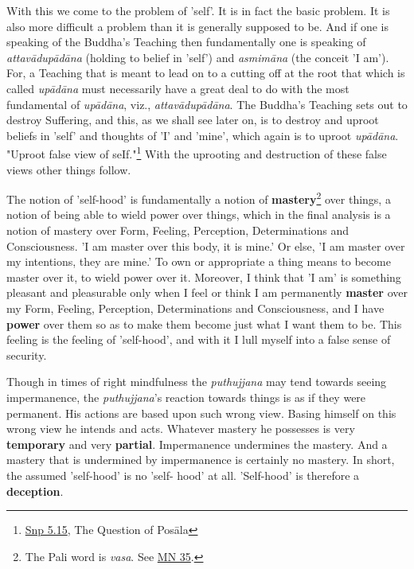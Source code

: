 With this we come to the problem of 'self'. It is in fact the basic problem. It is also more difficult a problem than it is generally supposed to be. And if one is speaking of the Buddha's Teaching then fundamentally one is speaking of \emph{attavādupādāna} (holding to belief in 'self') and \emph{asmimāna} (the conceit 'I am'). For, a Teaching that is meant to lead on to a cutting off at the root that which is called \emph{upādāna} must necessarily have a great deal to do with the most fundamental of \emph{upādāna}, viz., \emph{attavādupādāna}. The Buddha's Teaching sets out to destroy Suffering, and this, as we shall see later on, is to destroy and uproot beliefs in 'self' and thoughts of 'I' and 'mine', which again is to uproot \emph{upādāna}. "Uproot false view of seIf."\footnote{\href{https://suttacentral.net/snp5.15/en/sujato}{Snp 5.15}, The Question of Posāla} With the uprooting and destruction of these false views other things follow.

The notion of 'self-hood' is fundamentally a notion of \textbf{mastery}\footnote{The Pali word is \emph{vasa}. See \href{https://suttacentral.net/mn35/en/sujato}{MN 35}.} over things, a notion of being able to wield power over things, which in the final analysis is a notion of mastery over Form, Feeling, Perception, Determinations and Consciousness. 'I am master over this body, it is mine.' Or else, 'I am master over my intentions, they are mine.' To own or appropriate a thing means to become master over it, to wield power over it. Moreover, I think that 'I am' is something pleasant and pleasurable only when I feel or think I am permanently \textbf{master} over my Form, Feeling, Perception, Determinations and Consciousness, and I have \textbf{power} over them so as to make them become just what I want them to be. This feeling is the feeling of 'self-hood', and with it I lull myself into a false sense of security.

Though in times of right mindfulness the \emph{puthujjana} may tend towards seeing impermanence, the \emph{puthujjana}'s reaction towards things is as if they were permanent. His actions are based upon such wrong view. Basing himself on this wrong view he intends and acts. Whatever mastery he possesses is very \textbf{temporary} and very \textbf{partial}. Impermanence undermines the mastery. And a mastery that is undermined by impermanence is certainly no mastery. In short, the assumed 'self-hood' is no 'self- hood' at all. 'Self-hood' is therefore a \textbf{deception}.


